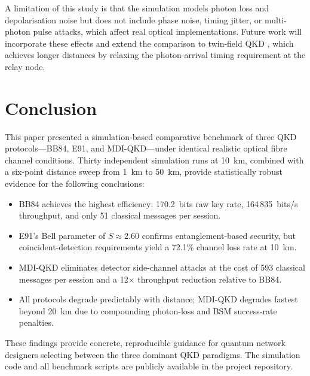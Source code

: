 \documentclass[conference]{IEEEtran}
\begin{document}
A limitation of this study is that the simulation models photon loss and
depolarisation noise but does not include phase noise, timing jitter, or
multi-photon pulse attacks, which affect real optical implementations.
Future work will incorporate these effects and extend the comparison to
twin-field QKD \cite{lucamarini2018}, which achieves longer distances by
relaxing the photon-arrival timing requirement at the relay node.

\section{Conclusion}

This paper presented a simulation-based comparative benchmark of three
QKD protocols---BB84, E91, and MDI-QKD---under identical realistic
optical fibre channel conditions. Thirty independent simulation runs at
10~km, combined with a six-point distance sweep from 1~km to 50~km,
provide statistically robust evidence for the following conclusions:

\begin{itemize}
  \item BB84 achieves the highest efficiency: 170.2~bits raw key rate,
        164\,835~bits/s throughput, and only 51 classical messages per session.
  \item E91's Bell parameter of $S \approx 2.60$ confirms entanglement-based
        security, but coincident-detection requirements yield a 72.1\% channel
        loss rate at 10~km.
  \item MDI-QKD eliminates detector side-channel attacks at the cost of
        593 classical messages per session and a 12$\times$ throughput
        reduction relative to BB84.
  \item All protocols degrade predictably with distance; MDI-QKD degrades
        fastest beyond 20~km due to compounding photon-loss and BSM
        success-rate penalties.
\end{itemize}

These findings provide concrete, reproducible guidance for quantum network
designers selecting between the three dominant QKD paradigms. The simulation
code and all benchmark scripts are publicly available in the project
repository.



\end{document}
